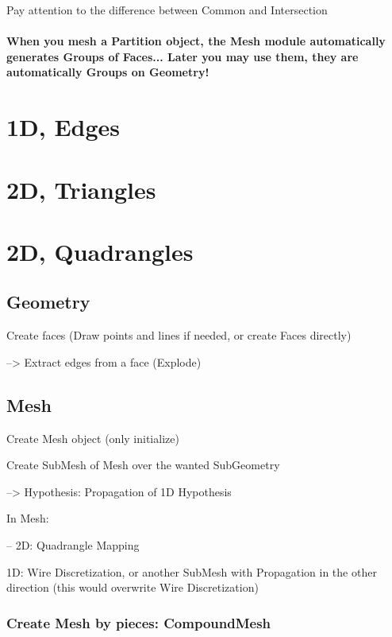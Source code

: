 \documentclass[10pt]{book}
\begin{document}
Pay attention to the difference between Common and Intersection


\paragraph{When you mesh a Partition object, the Mesh module automatically generates Groups of Faces... Later you may use them, they are automatically Groups on Geometry!}

 
 \section{1D, Edges}

 \section{2D, Triangles}
 
 \section{2D, Quadrangles}


\subsection{Geometry}


Create faces (Draw points and lines if needed, or create Faces directly)

   --> Extract edges from a face (Explode)
   
\subsection{Mesh}
 
Create Mesh object (only initialize)

Create SubMesh of Mesh over the wanted SubGeometry

   --> Hypothesis: Propagation of 1D Hypothesis

In Mesh:

--   2D: Quadrangle Mapping

   1D: Wire Discretization, or another SubMesh with Propagation in the other direction (this would overwrite Wire Discretization)

  
  \subsubsection{Create Mesh by pieces: CompoundMesh}
  
\end{document}
